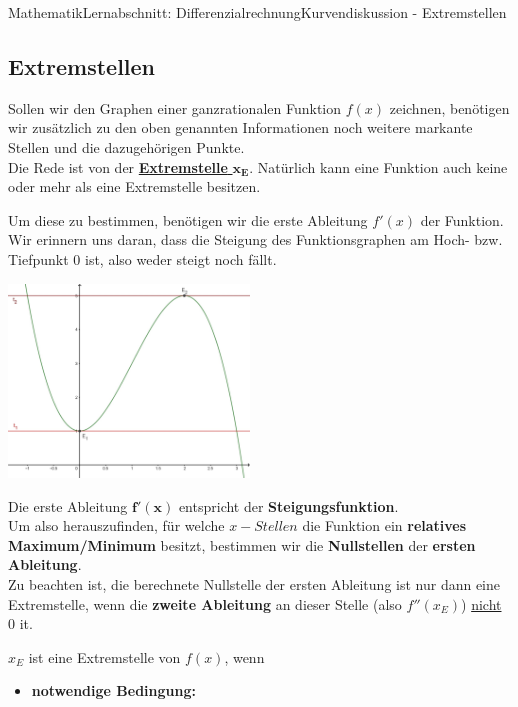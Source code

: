 \documentclass[11pt,twocolumn,oneside,openany,headings=optiontotoc,11pt,numbers=noenddot]{article}
\begin{document}
\begin{worksheet}{Mathematik}{Lernabschnitt: Differenzialrechnung}{Kurvendiskussion - Extremstellen}
		\subsection{Extremstellen}
		Sollen wir den Graphen einer ganzrationalen Funktion \(f(x)\) zeichnen, benötigen wir zusätzlich zu den oben genannten Informationen noch weitere markante Stellen und die dazugehörigen Punkte.\\
		Die Rede ist von der \underline{\textbf{Extremstelle} \(\mathbf{x_{E}}\)}. Natürlich kann eine Funktion auch keine oder mehr als eine Extremstelle besitzen.\\
		\par\noindent
		Um diese zu bestimmen, benötigen wir die erste Ableitung \(f'(x)\) der Funktion.\\
		Wir erinnern uns daran, dass die Steigung des Funktionsgraphen am Hoch- bzw. Tiefpunkt 0 ist, also weder steigt noch fällt.\\
		\par\noindent
		\includegraphics[width=0.48\textwidth]{../99_Bilder/042_EST_Tang.jpg}\\
		\par\noindent
		Die erste Ableitung \(\mathbf{f'(x)}\) entspricht der \textbf{Steigungsfunktion}.\\
		Um also herauszufinden, für welche \(x-Stellen\) die Funktion ein \textbf{relatives Maximum/Minimum} besitzt, bestimmen wir die \textbf{Nullstellen} der \textbf{ersten Ableitung}.\\
		\normalcolor{} Zu beachten ist, die berechnete Nullstelle der ersten Ableitung ist nur dann eine Extremstelle, wenn die \textbf{zweite Ableitung} an dieser Stelle (also \(f''(x_E)\)) \underline{nicht} 0 it.
		\begin{framed}
			\noindent
			\(x_E\) ist eine Extremstelle von \(f(x)\), wenn
			\begin{itemize}[label=-]
				\item \textbf{notwendige Bedingung:}\\

\end{itemize}
\end{framed}
\end{worksheet}
\end{document}
